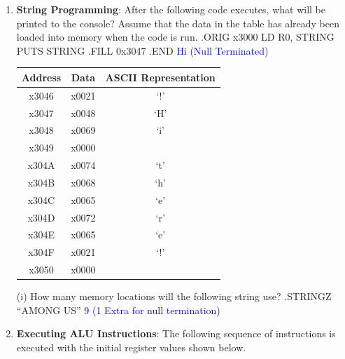 \documentclass{article}
\begin{document}
\begin{enumerate}[label=(\alph*)]
        \item \textbf{String Programming}: After the following code executes, what will be printed to the console? Assume that the data in the table has already been loaded into memory when the code is run.
        \newline
        \newline
        .ORIG x3000
        \newline
        LD R0, STRING
        \newline
        PUTS
        \newline
        STRING
        \newline
        	.FILL 0x3047
        \newline
        .END
        \newline
        \textcolor{blue}{Hi (Null Terminated)}
        \begin{table}[h]
        \centering
        \begin{tabular}{|c|c|c|}
        \hline
        \textbf{Address} & \textbf{Data} & \textbf{ASCII Representation} \\\hline
        x3046 & x0021 & ‘!’ \\\hline
        x3047 & x0048 & ‘H’ \\\hline
        x3048 & x0069 & ‘i’ \\\hline
        x3049 & x0000 &     \\\hline
        x304A & x0074 & ‘t’ \\\hline
        x304B & x0068 & ‘h’ \\\hline
        x304C & x0065 & ‘e’ \\\hline
        x304D & x0072 & ‘r’ \\\hline
        x304E & x0065 & ‘e’ \\\hline
        x304F & x0021 & ‘!’ \\\hline
        x3050 & x0000 &     \\
        \hline
        \end{tabular}
        \end{table}
        \newline
        (i) How many memory locations will the following string use?
        \newline
        .STRINGZ “AMONG US”
        \newline
        \textcolor{blue}{9 (1 Extra for null termination)}
        \newpage
        \item \textbf{Executing ALU Instructions}: The following sequence of instructions is executed with the initial register values shown below.

\end{enumerate}
\end{document}
